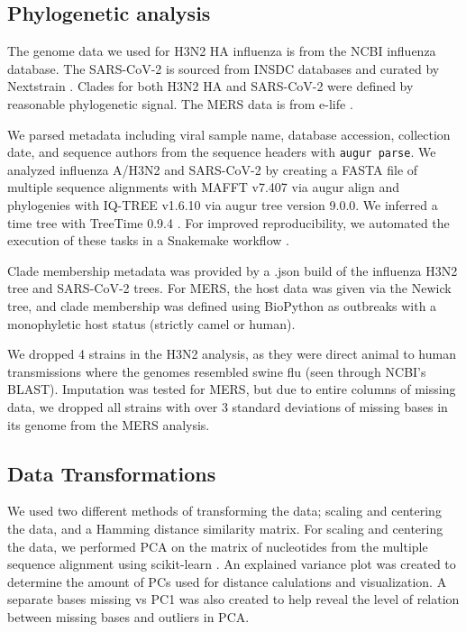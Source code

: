 \documentclass[10pt,letterpaper]{article}
\begin{document}
\subsection*{Phylogenetic analysis}

The genome data we used for H3N2 HA influenza is from the NCBI influenza database.
The SARS-CoV-2 is sourced from INSDC databases and curated by Nextstrain \citep{Hadfield2018}.
Clades for both H3N2 HA and SARS-CoV-2 were defined by reasonable phylogenetic signal.
The MERS data is from e-life \citep{dudas_carvalho_rambaut_bedford_2018}.

We parsed metadata including viral sample name, database accession, collection date, and sequence authors from the sequence headers with \texttt{augur parse}.
We analyzed influenza A/H3N2 and SARS-CoV-2 by creating a FASTA file of multiple sequence alignments with MAFFT v7.407 \citep{Katoh2002} via augur align \citep{Hadfield2018} and phylogenies with IQ-TREE v1.6.10 \citep{Nguyen2014} via augur tree version 9.0.0.
We inferred a time tree with TreeTime 0.9.4 \citep{Sagulenko2018}.
For improved reproducibility, we automated the execution of these tasks in a Snakemake workflow \citep{molder_2021}.

Clade membership metadata was provided by a .json build of the influenza H3N2 tree and SARS-CoV-2 trees.
For MERS, the host data was given via the Newick tree, and clade membership was defined using BioPython as outbreaks with a monophyletic host status (strictly camel or human).

We dropped 4 strains in the H3N2 analysis, as they were direct animal to human transmissions where the genomes resembled swine flu (seen through NCBI's BLAST).
Imputation was tested for MERS, but due to entire columns of missing data, we dropped all strains with over 3 standard deviations of missing bases in its genome from the MERS analysis.

\subsection*{Data Transformations}

We used two different methods of transforming the data; scaling and centering the data, and a Hamming distance similarity matrix.
For scaling and centering the data, we performed PCA on the matrix of nucleotides from the multiple sequence alignment using scikit-learn \citep{jolliffe_cadima_2016}.
An explained variance plot was created to determine the amount of PCs used for distance calulations and visualization.
A separate bases missing vs PC1 was also created to help reveal the level of relation between missing bases and outliers in PCA.
\end{document}
